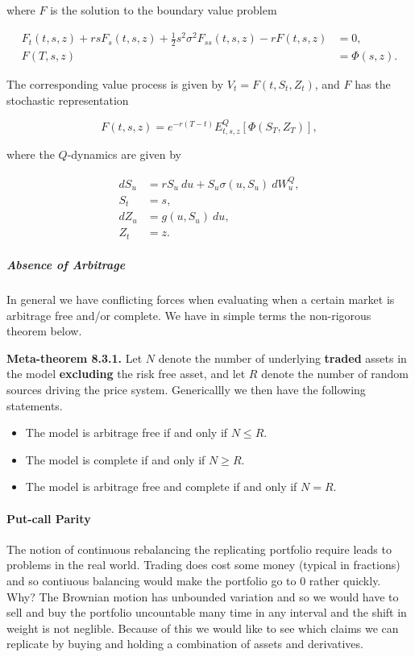 \documentclass[
]{article}
\providecommand{\tightlist}{%
  \setlength{\itemsep}{0pt}\setlength{\parskip}{0pt}}
\begin{document}
where \(F\) is the solution to the boundary value problem

\begin{align*}
F_t(t,s,z)+rsF_s(t,s,z)+\frac{1}{2}s^2\sigma^2F_{ss}(t,s,z)-rF(t,s,z)&=0,\\
F(T,s,z)&=\Phi(s,z).
\end{align*}

The corresponding value process is given by \(V_t=F(t,S_t,Z_t)\), and
\(F\) has the stochastic representation

\[
F(t,s,z)=e^{-r(T-t)}E^Q_{t,s,z}[\Phi(S_T,Z_T)],
\]

where the \(Q\)-dynamics are given by

\begin{align*}
dS_u&=rS_u\ du + S_u\sigma(u,S_u)\ dW^Q_u,\\
S_t&=s,\\
dZ_u&=g(u,S_u)\ du,\\
Z_t&=z.
\end{align*}

\hypertarget{absence-of-arbitrage-1}{%
\subparagraph{Absence of Arbitrage}\label{absence-of-arbitrage-1}}

In general we have conflicting forces when evaluating when a certain
market is arbitrage free and/or complete. We have in simple terms the
non-rigorous theorem below.

\textbf{Meta-theorem 8.3.1.} Let \(N\) denote the number of underlying
\textbf{traded} assets in the model \textbf{excluding} the risk free
asset, and let \(R\) denote the number of random sources driving the
price system. Genericallly we then have the following statements.

\begin{itemize}
\tightlist
\item
  The model is arbitrage free if and only if \(N\le R\).
\item
  The model is complete if and only if \(N\ge R\).
\item
  The model is arbitrage free and complete if and only if \(N=R\).
\end{itemize}

\hypertarget{put-call-parity}{%
\paragraph{Put-call Parity}\label{put-call-parity}}

The notion of continuous rebalancing the replicating portfolio require
leads to problems in the real world. Trading does cost some money
(typical in fractions) and so contiuous balancing would make the
portfolio go to 0 rather quickly. Why? The Brownian motion has unbounded
variation and so we would have to sell and buy the portfolio uncountable
many time in any interval and the shift in weight is not neglible.
Because of this we would like to see which claims we can replicate by
buying and holding a combination of assets and derivatives.
\end{document}
